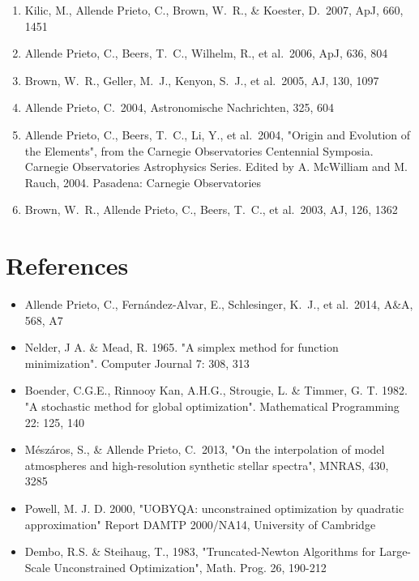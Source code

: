 \documentclass[12pt]{article}
\begin{document}
\begin{enumerate}
\item Kilic, M., Allende 
Prieto, C., Brown, W.~R., \& Koester, D.\ 2007, ApJ, 660, 1451 


\item Allende Prieto, 
C., Beers, T.~C., Wilhelm, R., et al.\ 2006, ApJ, 636, 804 


\item Brown, W.~R., Geller, 
M.~J., Kenyon, S.~J., et al.\ 2005, AJ, 130, 1097 


\item Allende Prieto, C.\ 
2004, Astronomische Nachrichten, 325, 604 


\item Allende Prieto, 
C., Beers, T.~C., Li, Y., et al.\ 2004, 
"Origin and Evolution of the Elements", from the Carnegie Observatories Centennial Symposia. Carnegie Observatories Astrophysics Series. Edited by A. McWilliam and M. Rauch, 2004. Pasadena: Carnegie Observatories

\item Brown, W.~R., Allende 
Prieto, C., Beers, T.~C., et al.\ 2003, AJ, 126, 1362 

\end{enumerate}

\section{References}

\begin{itemize}
\item Allende Prieto, C., Fern{\'a}ndez-Alvar, E., Schlesinger, K.~J., et al.\ 2014, A\&A, 568, A7 
\item Nelder, J A. \&  Mead, R. 1965. "A simplex method for function minimization". 
Computer Journal 7: 308, 313
\item  Boender, C.G.E., Rinnooy Kan, A.H.G., Strougie, L. \& Timmer, G. T. 1982. 
"A stochastic method for global optimization". Mathematical Programming 22: 125, 140
\item M{\'e}sz{\'a}ros, S., \& Allende Prieto, C.\ 2013, "On the interpolation of 
model atmospheres and high-resolution synthetic stellar spectra", MNRAS, 430, 3285 
\item Powell, M. J. D. 2000, "UOBYQA: unconstrained optimization by
quadratic approximation"  Report DAMTP 2000/NA14, University of Cambridge
\item Dembo, R.S. \& Steihaug, T., 1983, "Truncated-Newton Algorithms for 
Large-Scale Unconstrained Optimization", Math. Prog. 26, 190-212 
\end{itemize}
\end{document}
